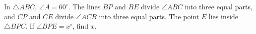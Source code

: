 In $\triangle ABC$, $\angle A=60^\circ$. The lines $BP$ and $BE$ divide $\angle ABC$ into three equal parts, and $CP$ and $CE$ divide $\angle ACB$ into three equal parts. The point $E$ lies inside $\triangle BPC$. If $\angle BPE=x^{\circ}$, find $x$.
